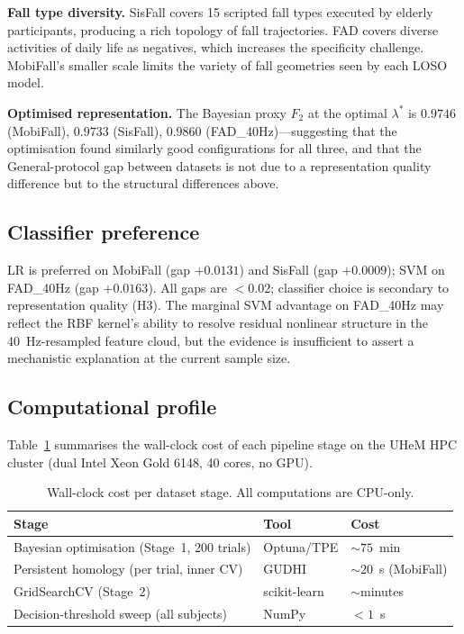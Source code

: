 \documentclass[onluarkali,ingilizce,yukseklisans,karton,LisansustuEgitim]{itutez}
\providecommand{\1}{\mathbf{1}}
\begin{document}
\textbf{Fall type diversity.}  SisFall covers 15 scripted fall types executed by
elderly participants, producing a rich topology of fall trajectories.  FAD covers
diverse activities of daily life as negatives, which increases the specificity
challenge.  MobiFall's smaller scale limits the variety of fall geometries seen by
each LOSO model.

\textbf{Optimised representation.}  The Bayesian proxy $F_2$ at the optimal $\lambda^*$
is $0.9746$ (MobiFall), $0.9733$ (SisFall), $0.9860$ (FAD\_40Hz)---suggesting that
the optimisation found similarly good configurations for all three, and that the
General-protocol gap between datasets is not due to a representation quality
difference but to the structural differences above.

\subsection{Classifier preference}

LR is preferred on MobiFall (gap $+0.0131$) and SisFall (gap $+0.0009$); SVM on
FAD\_40Hz (gap $+0.0163$).  All gaps are $<0.02$; classifier choice is secondary
to representation quality (H3).  The marginal SVM advantage on FAD\_40Hz may
reflect the RBF kernel's ability to resolve residual nonlinear structure in the
40~Hz-resampled feature cloud, but the evidence is insufficient to assert a
mechanistic explanation at the current sample size.

\subsection{Computational profile}

Table~\ref{tab:compute} summarises the wall-clock cost of each pipeline stage on the
UHeM HPC cluster (dual Intel Xeon Gold 6148, 40 cores, no GPU).

\begin{table}[h!]
\centering
\caption{Wall-clock cost per dataset stage.  All computations are CPU-only.}
\label{tab:compute}
\small
\begin{tabular}{lll}
\toprule
\textbf{Stage} & \textbf{Tool} & \textbf{Cost} \\
\midrule
Bayesian optimisation (Stage~1, 200 trials) & Optuna/TPE & ${\sim}75$~min \\
Persistent homology (per trial, inner CV)   & GUDHI      & ${\sim}20$~s (MobiFall) \\
GridSearchCV (Stage~2)                      & scikit-learn & ${\sim}$minutes \\
Decision-threshold sweep (all subjects)     & NumPy      & $<1$~s \\
\bottomrule
\end{tabular}
\end{table}
\end{document}
